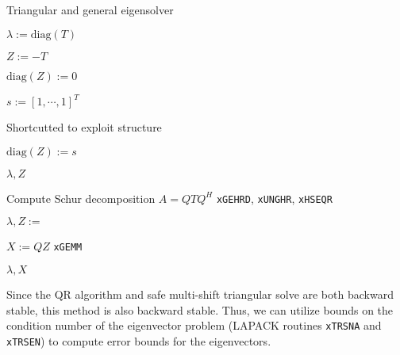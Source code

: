 \documentclass{article}
\begin{document}
\begin{algorithm}[H]
  \caption{Triangular and general eigensolver}
  \label{algorithm:eig}
  \begin{algorithmic}
    

    \State \(\lambda := \text{diag}(T)\)

    \State \(Z := -T\)

    \State \(\text{diag}(Z) := 0\)

    \State \(s := \left[1,\cdots,1\right]^T\)

    \State {}
    \Comment Shortcutted to exploit structure

    \State \(\text{diag}(Z) := s\)

    \State \Return \(\lambda, Z\)

    \EndFunction


    \State Compute Schur decomposition \(A=QTQ^H\) \Comment \texttt{xGEHRD}, \texttt{xUNGHR}, \texttt{xHSEQR}

    \State \(\lambda, Z := \) 

    \State \(X := Q Z\) \Comment \texttt{xGEMM}

    \State \Return \(\lambda, X\)

    \EndFunction

  \end{algorithmic}
\end{algorithm}
\noindent
Since the QR algorithm and safe multi-shift triangular solve are both
backward stable, this method is also backward stable. Thus, we can
utilize bounds on the condition number of the eigenvector problem
(LAPACK routines \texttt{xTRSNA} and \texttt{xTRSEN})
\cite{bai1989conditioning} to compute error bounds for the
eigenvectors.
\end{document}

